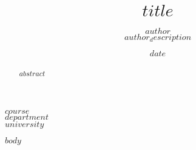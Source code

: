 \documentclass[12pt]{article}
\title{\textbf{\LARGE $title$}}
\author{$author$ \\ $author_description$}
\date{$date$}
\begin{document}
\maketitle

\begin{center}
  $course$ \\
  $department$ \\
  $university$ \\
\end{center}

\begin{abstract}
$abstract$
\end{abstract}

\newpage

$body$ %

\printbibliography[heading=bibintoc, title={References}] %
\end{document}
